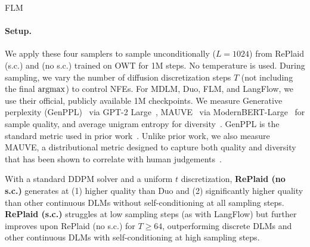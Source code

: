 \documentclass{article}
\begin{document}
%

FLM 

\paragraph{Setup.} We apply these four samplers to sample unconditionally ($L=1024$) from RePlaid (s.c.) and (no s.c.) trained on OWT for 1M steps. No temperature is used. During sampling, we vary the number of diffusion discretization steps $T$ (not including the final $\operatorname*{argmax}$) to control NFEs. For MDLM, Duo, FLM, and LangFlow, we use their official, publicly available 1M checkpoints. We measure Generative perplexity (GenPPL)~\citep{dieleman2022continuous} via GPT-2 Large~\citep{radford2019language}, MAUVE~\citep{pillutla2021mauve} via ModernBERT-Large~\citep{warner2025smarter}  for sample quality, and average unigram entropy for diversity~\citep{zheng2024masked}. GenPPL is the standard metric used in prior work~\citep{sahoo2024simple, sahoo2025the, lee2026flow, potaptchik2026discrete, chen2026langflow}. Unlike prior work, we also measure MAUVE, a distributional metric designed to capture both quality and diversity that has been shown to correlate with human judgements~\citep{pillutla2021mauve}.

%

%



%

%

%

\begin{findingbox}
With a standard DDPM solver and a uniform $t$ discretization, \textbf{RePlaid (no s.c.)} generates at (1) higher quality than Duo and (2) significantly higher quality than other continuous DLMs without self-conditioning at all sampling steps. \textbf{RePlaid (s.c.)} struggles at low sampling steps (as with LangFlow) but further improves upon RePlaid (no s.c.) for $T\geq64$, outperforming discrete DLMs and other continuous DLMs with self-conditioning at high sampling steps.
\end{findingbox}

%
%
%

%

%

%

%


%

%
\end{document}
